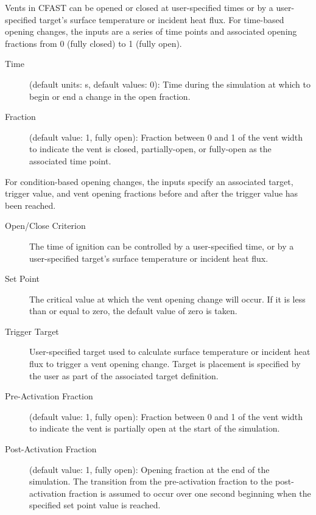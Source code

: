 Vents in CFAST can be opened or closed at user-specified times or by a user-specified target's surface temperature or incident heat flux. For time-based opening changes, the inputs are a series of time points and associated opening fractions from 0 (fully closed) to 1 (fully open).

\begin{description}
\item[Time] (default units: s, default values: 0): Time during the simulation at which to begin or end a change in the open fraction.
\item[Fraction] (default value: 1, fully open): Fraction between 0 and 1 of the vent width to indicate the vent is closed, partially-open, or fully-open as the associated time point.
\end{description}

For condition-based opening changes, the inputs specify an associated target, trigger value, and vent opening fractions before and after the trigger value has been reached.

\begin{description}
\item[Open/Close Criterion] The time of ignition can be controlled by a user-specified time, or by a user-specified target's surface temperature or incident heat flux.
\item[Set Point] The critical value at which the vent opening change will occur. If it is less than or equal to zero, the default value of zero is taken.
\item[Trigger Target] User-specified target used to calculate surface temperature or incident heat flux to trigger a vent opening change. Target is placement is specified by the user as part of the associated target definition.
\item[Pre-Activation Fraction] (default value: 1, fully open): Fraction between 0 and 1 of the vent width to indicate the vent is partially open at the start of the simulation.
\item[Post-Activation Fraction] (default value: 1, fully open): Opening fraction at the end of the simulation. The transition from the pre-activation fraction to the post-activation fraction is assumed to occur over one second beginning when the specified set point value is reached.
\end{description}

